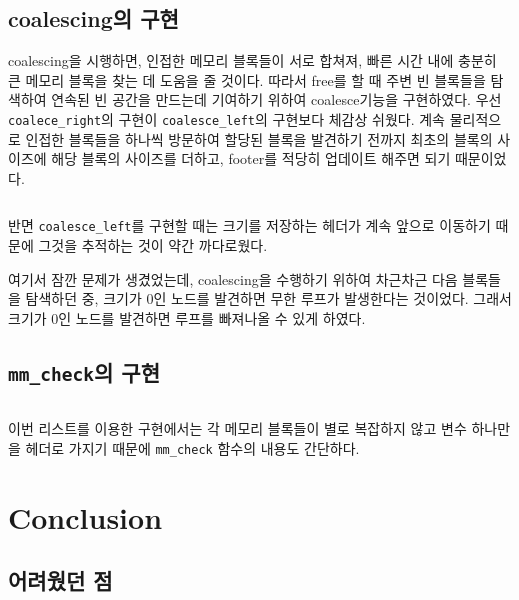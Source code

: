 \documentclass{report}
\begin{document}
\inputminted[firstline=181,lastline=267, linenos, breaklines]{C}{mm.c}

\subsection{coalescing의 구현}
coalescing을 시행하면, 인접한 메모리 블록들이 서로 합쳐져, 빠른 시간 내에 충분히 큰 메모리 블록을 찾는 데 도움을 줄 것이다. 따라서 free를 할 때 주변 빈 블록들을 탐색하여 연속된 빈 공간을 만드는데 기여하기 위하여 coalesce기능을 구현하였다.
우선 \lstinline{coalece_right}의 구현이 \lstinline{coalesce_left}의 구현보다 체감상 쉬웠다. 계속 물리적으로 인접한 블록들을 하나씩 방문하여 할당된 블록을 발견하기 전까지 최초의 블록의 사이즈에 해당 블록의 사이즈를 더하고, footer를 적당히 업데이트 해주면 되기 때문이었다.
\inputminted[firstline=119,lastline=134, linenos, breaklines]{C}{mm.c}
반면 \lstinline{coalesce_left}를 구현할 때는 크기를 저장하는 헤더가 계속 앞으로 이동하기 때문에 그것을 추적하는 것이 약간 까다로웠다.

여기서 잠깐 문제가 생겼었는데, coalescing을 수행하기 위하여 차근차근 다음 블록들을 탐색하던 중, 크기가 0인 노드를 발견하면 무한 루프가 발생한다는 것이었다. 그래서 크기가 0인 노드를 발견하면 루프를 빠져나올 수 있게 하였다. 
\subsection{\lstinline{mm_check}의 구현}
\inputminted[firstline=269,lastline=287, linenos, breaklines]{C}{mm.c}
이번 리스트를 이용한 구현에서는 각 메모리 블록들이 별로 복잡하지 않고 변수 하나만을 헤더로 가지기 때문에 \lstinline{mm_check} 함수의 내용도 간단하다.

\section{Conclusion}
\subsection{어려웠던 점}
\end{document}
